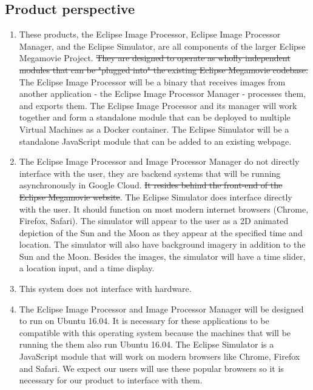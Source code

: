 \documentclass[10pt, onecolumn, draftclsnofoot, letterpaper, compsoc]{IEEEtran}
\begin{document}
\subsection{Product perspective}
	\begin{enumerate}
		\item These products, the Eclipse Image Processor, Eclipse Image
		Processor Manager, and the Eclipse Simulator, are all components of
		the larger Eclipse Megamovie Project. \sout{They are designed to operate as wholly
		independent modules that can be "plugged into" the existing
		Eclipse Megamovie codebase.} The Eclipse Image Processor will be
		a binary that receives images from another application - the Eclipse
		Image Processor Manager - processes them, and exports them. The Eclipse
		Image Processor and its manager will work together and form a standalone module
		that can be deployed to multiple Virtual Machines as a Docker container.
		The Eclipse Simulator will be a standalone JavaScript module that can be added to an
		existing webpage.

		\item The Eclipse Image Processor and Image Processor Manager
		do not directly interface with the user, they are backend
		systems that will be running asynchronously in Google Cloud.
		\sout{It resides behind the front-end of the Eclipse
		Megamovie website}. The Eclipse Simulator does interface
		directly with the user. It should function on most modern
		internet browsers (Chrome, Firefox, Safari). The simulator
		will appear to the user as a 2D animated depiction of the
		Sun and the Moon as they appear at the specified time and
		location. The simulator will also have background imagery in
		addition to the Sun and the Moon. Besides the images, the
		simulator will have a time slider, a location input, and a
		time display.

		\item This system does not interface with hardware.

		\item The Eclipse Image Processor and Image Processor Manager
		will be designed to run on Ubuntu 16.04. It is necessary for these
		applications to be compatible with this operating system because
		the machines that will be running the them also run Ubuntu 16.04. The Eclipse
		Simulator is a JavaScript module that will work on modern
		browsers like Chrome, Firefox and Safari. We expect our
		users will use these popular browsers so it is necessary
		for our product to interface with them.
	\end{enumerate}
\end{document}
